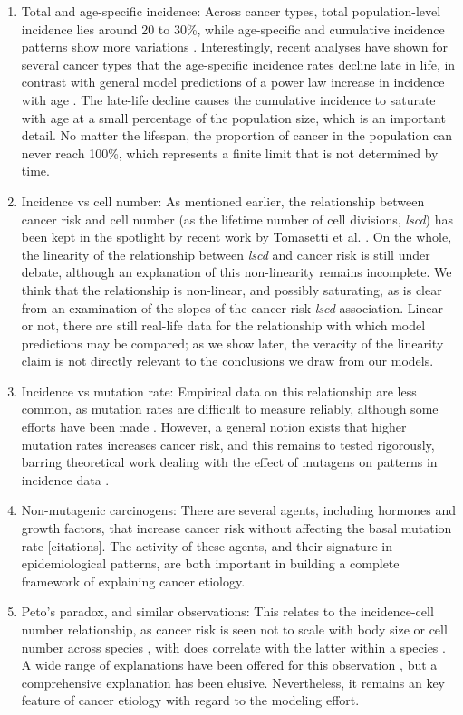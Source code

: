 \documentclass[9pt,twocolumn,twoside]{pnas-new}
\begin{document}
\begin{enumerate}
	\item Total and age-specific incidence: Across cancer types, total population-level incidence lies around 20 to 30\%, while age-specific and cumulative incidence patterns show more variations \cite{AmericanCancerSociety2016}. Interestingly, recent analyses have shown for several cancer types that the age-specific incidence rates decline late in life, in contrast with general model predictions of a power law increase in incidence with age \cite{Harding2012}. The late-life decline causes the cumulative incidence to saturate with age at a small percentage of the population size, which is an important detail. No matter the lifespan, the proportion of cancer in the population can never reach 100\%, which represents a finite limit that is not determined by time.
	\item Incidence vs cell number: As mentioned earlier, the relationship between cancer risk and cell number (as the lifetime number of cell divisions, \textit{lscd}) has been kept in the spotlight by recent work by Tomasetti et al. \cite{Tomasetti78, Tomasetti2017}. On the whole, the linearity of the relationship between \textit{lscd} and cancer risk is still under debate, although an explanation of this non-linearity remains incomplete. We think that the relationship is non-linear, and possibly saturating, as is clear from an examination of the slopes of the cancer risk-\textit{lscd} association. Linear or not, there are still real-life data for the relationship with which model predictions may be compared; as we show later, the veracity of the linearity claim is not directly relevant to the conclusions we draw from our models.
	\item Incidence vs mutation rate: Empirical data on this relationship are less common, as mutation rates are difficult to measure reliably, although some efforts have been made \cite{Hao2016}. However, a general notion exists that higher mutation rates increases cancer risk, and this remains to tested rigorously, barring theoretical work dealing with the effect of mutagens on patterns in incidence data \cite{Frank2007}.
	\item Non-mutagenic carcinogens: There are several agents, including hormones and growth factors, that increase cancer risk without affecting the basal mutation rate [citations]. The activity of these agents, and their signature in epidemiological patterns, are both important in building a complete framework of explaining cancer etiology.
	\item Peto's paradox, and similar observations: This relates to the incidence-cell number relationship, as cancer risk is seen not to scale with body size or cell number across species \cite{Nagy2007}, with does correlate with the latter within a species \cite{Noble2015}. A wide range of explanations have been offered for this observation \cite{Tollis2017b}, but a comprehensive explanation has been elusive. Nevertheless, it remains an key feature of cancer etiology with regard to the modeling effort.

\end{enumerate}
\end{document}
